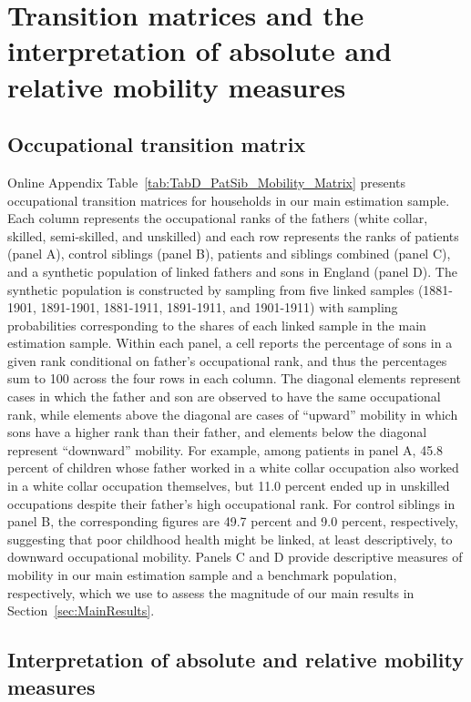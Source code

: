 \documentclass[12pt,english]{article}
\begin{document}
\section{Transition matrices and the interpretation of absolute and relative mobility measures \label{sec:transition-matrix-mobility}}

\subsection{Occupational transition matrix}\label{subsec:matrix}

 Online Appendix Table~\ref{tab:TabD_PatSib_Mobility_Matrix} presents occupational transition matrices for households in our main estimation sample. Each column represents the occupational ranks of the fathers (white collar, skilled, semi-skilled, and unskilled) and each row represents the ranks of patients (panel A), control siblings (panel B), patients and siblings combined (panel C), and a synthetic population of linked fathers and sons in England (panel D). The synthetic population is constructed by sampling from five linked samples (1881-1901, 1891-1901, 1881-1911, 1891-1911, and 1901-1911) with sampling probabilities corresponding to the shares of each linked sample in the main estimation sample. Within each panel, a cell reports the percentage of sons in a given rank conditional on father's occupational rank, and thus the percentages sum to 100 across the four rows in each column. The diagonal elements represent cases in which the father and son are observed to have the same occupational rank, while elements above the diagonal are cases of ``upward'' mobility in which sons have a higher rank than their father, and elements below the diagonal represent ``downward'' mobility. For example, among patients in panel A, 45.8 percent of children whose father worked in a white collar occupation also worked in a white collar occupation themselves, but 11.0 percent ended up in unskilled occupations despite their father's high occupational rank. For control siblings in panel B, the corresponding figures are 49.7 percent and 9.0 percent, respectively, suggesting that poor childhood health might be linked, at least descriptively, to downward occupational mobility. Panels C and D provide descriptive measures of mobility in our main estimation sample and a benchmark population, respectively, which we use to assess the magnitude of our main results in Section~\ref{sec:MainResults}.

\subsection{Interpretation of absolute and relative mobility measures}\label{subsec:mobility_interpretation}
\end{document}
